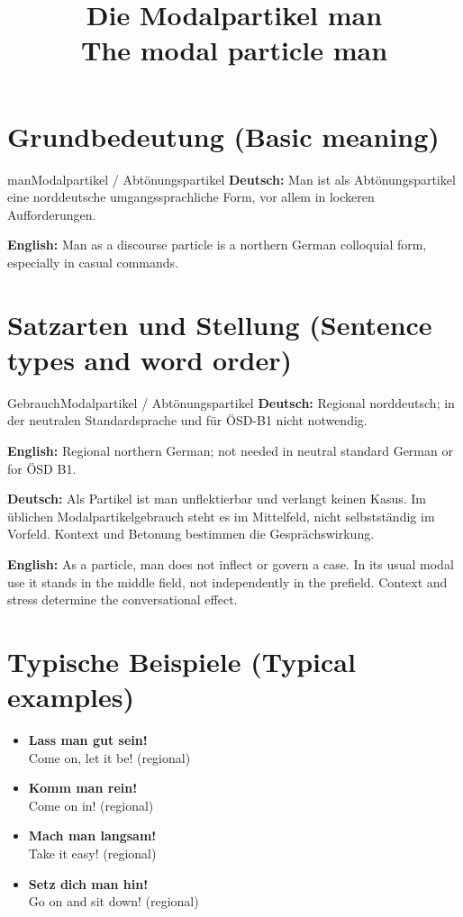 \documentclass[a4paper,11pt]{article}
\title{Die Modalpartikel \glqq man\grqq\\{\large\textnormal{The modal particle man}}}
\date{}
\newcommand{\GermanText}[1]{\textbf{Deutsch: }#1\par}
\newcommand{\EnglishText}[1]{{\small\color{SoftGray}\textbf{English: }#1\par}}
\newcommand{\ExampleItem}[2]{\item \textbf{#1}\\{\small\color{SoftGray}#2}}
\begin{document}
\maketitle
\tableofcontents
\section{Grundbedeutung \textnormal{(Basic meaning)}}
\begin{grammarentry}{man}{Modalpartikel / Abtönungspartikel}
\GermanText{Man ist als Abtönungspartikel eine norddeutsche umgangssprachliche Form, vor allem in lockeren Aufforderungen.}
\EnglishText{Man as a discourse particle is a northern German colloquial form, especially in casual commands.}
\end{grammarentry}
\section{Satzarten und Stellung \textnormal{(Sentence types and word order)}}
\begin{grammarentry}{Gebrauch}{Modalpartikel / Abtönungspartikel}
\GermanText{Regional norddeutsch; in der neutralen Standardsprache und für ÖSD-B1 nicht notwendig.}
\EnglishText{Regional northern German; not needed in neutral standard German or for ÖSD B1.}
\end{grammarentry}
\GermanText{Als Partikel ist man unflektierbar und verlangt keinen Kasus. Im üblichen Modalpartikelgebrauch steht es im Mittelfeld, nicht selbstständig im Vorfeld. Kontext und Betonung bestimmen die Gesprächswirkung.}
\EnglishText{As a particle, man does not inflect or govern a case. In its usual modal use it stands in the middle field, not independently in the prefield. Context and stress determine the conversational effect.}
\section{Typische Beispiele \textnormal{(Typical examples)}}
\begin{exbox}\begin{itemize}
\ExampleItem{Lass man gut sein!}{Come on, let it be! (regional)}
\ExampleItem{Komm man rein!}{Come on in! (regional)}
\ExampleItem{Mach man langsam!}{Take it easy! (regional)}
\ExampleItem{Setz dich man hin!}{Go on and sit down! (regional)}
\end{itemize}\end{exbox}
\end{document}
